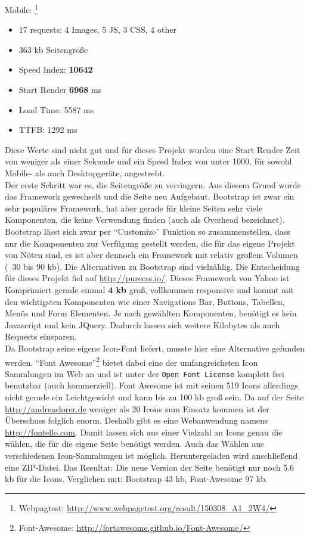 		Mobile: \footnote{Webpagtest: \url{http://www.webpagetest.org/result/150308_A1_2W4/}}
		\begin{itemize}
			\item 17 requests: 4 Images, 5 JS, 3 CSS, 4 other
			\item 363 kb Seitengröße
			\item Speed Index: \textbf{10642}
			\item Start Render \textbf{6968} ms
			\item Load Time: 5587 ms
			\item TTFB: 1292 ms
		\end{itemize}

		Diese Werte sind nicht gut und für dieses Projekt wurden eine Start Render Zeit von weniger als einer Sekunde und ein Speed Index von unter 1000, für sowohl Mobile- als auch Desktopgeräte, angestrebt.\\

		Der erste Schritt war es, die Seitengröße zu verringern. Aus diesem Grund wurde das Framework gewechselt und die Seite neu Aufgebaut. Bootstrap ist zwar ein sehr populäres Framework, hat aber gerade für kleine Seiten sehr viele Komponenten, die keine Verwendung finden (auch als Overhead bezeichnet). Bootstrap lässt sich zwar per "`Customize"' Funktion so zusammenstellen, dass nur die Komponenten zur Verfügung gestellt werden, die für das eigene Projekt von Nöten sind, es ist aber dennoch ein Framework mit relativ großem Volumen (~30 bis 90 kb). Die Alternativen zu Bootstrap sind vielzählig. Die Entscheidung für dieses Projekt fiel auf \url{http://purecss.io/}. Dieses Framework von Yahoo ist Komprimiert gerade einmal \textbf{4 kb} groß, vollkommen responsive und kommt mit den wichtigsten Komponenten wie einer Navigations Bar, Buttons, Tabellen, Menüs und Form Elementen. Je nach gewählten Komponenten, benötigt es kein Javascript und kein JQuery. Dadurch lassen sich weitere Kilobytes als auch Requests einsparen.\\
		Da Bootstrap seine eigene Icon-Font liefert, musste hier eine Alternative gefunden werden. "`Font Awesome"'\footnote{Font-Awesome: \url{http://fortawesome.github.io/Font-Awesome/}} bietet dabei eine der umfangreichsten Icon Sammlungen im Web an und ist unter der \texttt{Open Font License} komplett frei benutzbar (auch kommerziell). Font Awesome ist mit seinen 519 Icons allerdings nicht gerade ein Leichtgewicht und kann bis zu 100 kb groß sein. Da auf der Seite \url{http://andreaslorer.de} weniger als 20 Icons zum Einsatz kommen ist der Überschuss folglich enorm. Deshalb gibt es eine Webanwendung namens \url{http://fontello.com}. Damit lassen sich aus einer Vielzahl an Icons genau die wählen, die für die eigene Seite benötigt werden. Auch das Wählen aus verschiedenen Icon-Sammlungen ist möglich. Heruntergeladen wird anschließend eine ZIP-Datei. Das Resultat: Die neue Version der Seite benötigt nur noch 5.6 kb für die Icons. Verglichen mit: Bootstrap 43 kb, Font-Awesome 97 kb.\\

